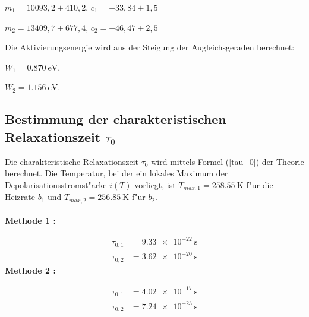  \begin{center}
$m_1=10093,2 \pm 410,2 $, $c_1=-33,84 \pm 1,5$
\end{center}

\begin{center}
$m_2=13409,7 \pm 677,4$, $c_2=-46,47 \pm 2,5$
\end{center}

Die Aktivierungsenergie wird aus der Steigung der Augleichsgeraden berechnet:

\begin{center}
$W_1=\SI{0,870}{\electronvolt}$,
\end{center}

\begin{center}
$W_2=\SI{1,156}{\electronvolt}$.
\end{center}



\subsection{\texorpdfstring{Bestimmung der charakteristischen Relaxationszeit $\tau_0$}{Bestimmung der charakteristischen Relaxationszeit Tau-0}}
  Die charakteristische Relaxationszeit $\tau_0$ wird mittels Formel (\ref{tau_0}) der Theorie berechnet.
  Die Temperatur, bei der ein lokales Maximum der Depolarisationsstromst"arke $i(T)$ vorliegt, ist $T_{max,1}=\SI{258,55}{\kelvin}$ f"ur die Heizrate $b_1$ und $T_{max,2} = \SI{256,85}{\kelvin}$ f"ur $b_2$.\\
  \\\textbf{Methode 1 :}

    \begin{align}
      \tau_{0,1}&=\SI{9,33e-22}{\second}\\
      \tau_{0,2}&=\SI{3,62e-20}{\second}
    \end{align}
  \textbf{Methode 2 :}

    \begin{align}
      \tau_{0,1}&=\SI{4,02e-17}{\second}\\
      \tau_{0,2}&=\SI{7,24e-23}{\second}
    \end{align}
